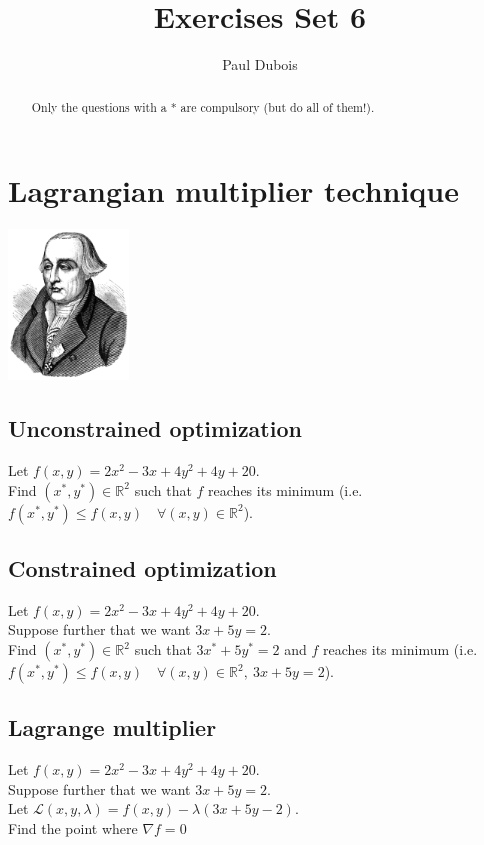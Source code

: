 \documentclass[]{article}
\title{Exercises Set 6}
\author{Paul Dubois}
\newcommand{\R}{\mathbb{R}}
\begin{document}
	
	\maketitle
	
	\begin{abstract}
		Only the questions with a * are compulsory (but do all of them!).
	\end{abstract}	
	
	\section{Lagrangian multiplier technique}
	\begin{center}
		\includegraphics[height=4cm]{Lagrange}
	\end{center}

	\subsection{Unconstrained optimization}
	Let $f(x,y) = 2x^2-3x + 4y^2 + 4y +20$.\\
	Find $(x^*,y^*) \in \R^2$ such that $f$ reaches its minimum (i.e. $f(x^*,y^*) \leq f(x,y) \quad \forall (x,y) \in \R^2$).
	
	\subsection{Constrained optimization}
	Let $f(x,y) = 2x^2-3x + 4y^2 + 4y +20$.\\
	Suppose further that we want $3x + 5y = 2$.\\
	Find $(x^*,y^*) \in \R^2$ such that $3x^* + 5y^* = 2$ and $f$ reaches its minimum (i.e. $f(x^*,y^*) \leq f(x,y) \quad \forall (x,y) \in \R^2,\ 3x + 5y = 2$).
	
	\subsection{Lagrange multiplier}
	Let $f(x,y) = 2x^2-3x + 4y^2 + 4y +20$.\\
	Suppose further that we want $3x + 5y = 2$.\\
	Let $\mathcal{L}(x,y,\lambda) = f(x,y) - \lambda (3x + 5y -2)$.\\
	Find the point where $\nabla f = 0$
	
\end{document}
